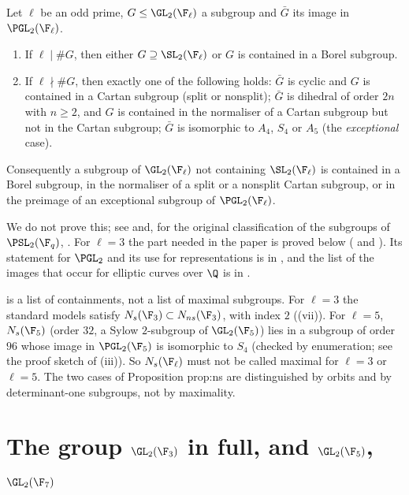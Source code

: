 \begin{theorem}[Dickson]\label{thm:groups:dickson}
Let $\ell$ be an odd prime, $G\le\GL_2(\F_\ell)$ a subgroup and $\bar G$ its image in $\PGL_2(\F_\ell)$.
\begin{enumerate}[label=(\alph*)]
\item If $\ell\mid\#G$, then either $G\supseteq\SL_2(\F_\ell)$ or $G$ is contained in a Borel subgroup.
\item If $\ell\nmid\#G$, then exactly one of the following holds: $\bar G$ is cyclic and $G$ is contained in a Cartan subgroup (split or nonsplit); $\bar G$ is
dihedral of order $2n$ with $n\ge2$, and $G$ is contained in the normaliser of a Cartan subgroup but not in the Cartan subgroup; $\bar G$ is isomorphic to $A_4$,
$S_4$ or $A_5$ (the \emph{exceptional} case).
\end{enumerate}
Consequently a subgroup of $\GL_2(\F_\ell)$ not containing $\SL_2(\F_\ell)$ is contained in a Borel subgroup, in the normaliser of a split or a nonsplit Cartan
subgroup, or in the preimage of an exceptional subgroup of $\PGL_2(\F_\ell)$.
\end{theorem}

We do not prove this; see \cite[Section 2, Propositions 15 and 16]{Serre72} and, for the original classification of the subgroups of $\PSL_2(\F_q)$,
\cite{Dickson1901}. For $\ell=3$ the part needed in the paper is proved below ( and ). Its
statement for $\PGL_2$ and its use for representations is in , and the list of the images that occur for elliptic curves over $\Q$ is in
.

\begin{warning}\label{warn:groups:maximal}
 is a list of containments, not a list of maximal subgroups. For $\ell=3$ the standard models satisfy $N_s(\F_3)\subset N_{ns}(\F_3)$, with index
$2$ ((vii)). For $\ell=5$, $N_s(\F_5)$ (order $32$, a Sylow $2$-subgroup of $\GL_2(\F_5)$) lies in a subgroup of order $96$ whose image in
$\PGL_2(\F_5)$ is isomorphic to $S_4$ (checked by enumeration; see the proof sketch of (iii)). So $N_s(\F_\ell)$ must not be called maximal for
$\ell=3$ or $\ell=5$. The two cases of Proposition prop:ns are distinguished by orbits and by determinant-one subgroups, not by maximality.
\end{warning}

\section{The group \texorpdfstring{$\GL_2(\F_3)$}{GL2(F3)} in full, and \texorpdfstring{$\GL_2(\F_5)$}{GL2(F5)}, \texorpdfstring{$\GL_2(\F_7)$}{GL2(F7)}}\label{sec:groups:gl23}

